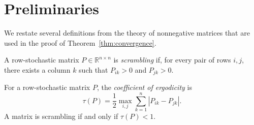 \section{Preliminaries}

We restate several definitions from the theory of nonnegative matrices
\citep{seneta2006nonnegative} that are used in the proof of
Theorem~\ref{thm:convergence}.

\begin{definition}
  A row-stochastic matrix $P \in \mathbb{R}^{n \times n}$ is \emph{scrambling} if,
  for every pair of rows $i, j$, there exists a column $k$ such that
  $P_{ik} > 0$ and $P_{jk} > 0$.
\end{definition}

\begin{definition}
  For a row-stochastic matrix $P$, the \emph{coefficient of ergodicity} is
  \begin{equation}
    \tau(P) = \frac{1}{2} \max_{i,j} \sum_{k=1}^n |P_{ik} - P_{jk}|.
  \end{equation}
  A matrix is scrambling if and only if $\tau(P) < 1$.
\end{definition}
